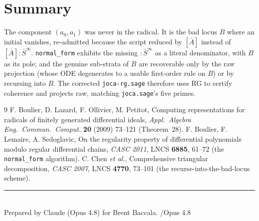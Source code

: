 \documentclass[11pt]{article}
\newcommand{\sat}[2]{[#1]\!:\!#2^{\infty}}
\newcommand{\Sbar}{\bar S}
\newcommand{\code}[1]{\texttt{#1}}
\begin{document}
\section*{Summary}

The component $(a_0,a_1)$ was never in the radical. It is the bad locus $B$ where
an initial vanishes, re-admitted because the script reduced by $[\bar A]$ instead
of $\sat{\bar A}{\Sbar}$. \code{normal\_form} exhibits the missing $:\Sbar^\infty$
as a literal denominator, with $B$ as its pole; and the genuine sub-strata of $B$
are recoverable only by the raw projection (whose ODE degenerates to a usable
first-order rule on $B$) or by recursing into $B$. The corrected
\code{joca-rg.sage} therefore uses RG to certify coherence and projects raw,
matching \code{joca.sage}'s five primes.

\begin{thebibliography}{9}
F. Boulier, D. Lazard, F. Ollivier, M. Petitot, Computing representations for
radicals of finitely generated differential ideals, \emph{Appl.\ Algebra Eng.\
Commun.\ Comput.} \textbf{20} (2009) 73--121 (Theorem~28).
F. Boulier, F. Lemaire, A. Sedoglavic, On the regularity property of
differential polynomials modulo regular differential chains, \emph{CASC 2011},
LNCS \textbf{6885}, 61--72 (the \code{normal\_form} algorithm).
C. Chen \emph{et al.}, Comprehensive triangular decomposition, \emph{CASC 2007},
LNCS \textbf{4770}, 73--101 (the recurse-into-the-bad-locus scheme).
\end{thebibliography}

\vfill
\noindent\rule{0.4\linewidth}{0.4pt}\\
{\small Prepared by Claude (Opus 4.8) for Brent Baccala. /Opus 4.8}
\end{document}
